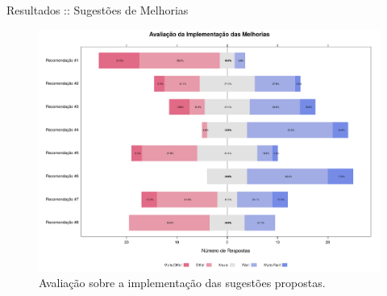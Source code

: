 \documentclass[t,14pt,mathserif]{beamer}
\begin{document}
\begin{frame}{Resultados :: Sugestões de Melhorias}

\begin{figure}[htpb]
    \centering
    \includegraphics[width=.9\linewidth]{../img/plot_likert_avaliacao_implementacao_melhorias.pdf}
    \caption{Avaliação sobre a implementação das sugestões propostas.}
\label{fig:plot_likert_avaliacao_implementacao_melhorias}
\end{figure}

\end{frame}
\end{document}
